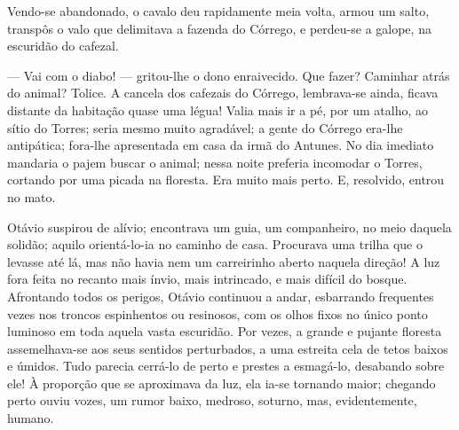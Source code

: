 {Vendo-se abandonado, o cavalo deu rapidamente meia volta, armou
um salto, transpôs o valo que delimitava a fazenda do
Córrego, e perdeu-se a galope, na escuridão do cafezal.

--- Vai com o diabo! --- gritou-lhe o dono enraivecido.
Que fazer? Caminhar atrás do animal? Tolice. A cancela dos cafezais do
Córrego, lembrava-se ainda, ficava distante da habitação
quase uma légua! Valia mais ir a pé, por um atalho, ao
sítio do Torres; seria mesmo muito agradável; a gente
do Córrego era-lhe antipática; fora-lhe apresentada em
casa da irmã do Antunes. No dia imediato mandaria o pajem
buscar o animal; nessa noite preferia incomodar o Torres, cortando por
uma picada na floresta. Era muito mais perto. E, resolvido, entrou no
mato.





Otávio suspirou de alívio; encontrava um guia, um
companheiro, no meio daquela solidão; aquilo orientá-lo-ia no caminho de
casa. Procurava uma trilha que o levasse até lá, mas não havia nem um
carreirinho aberto naquela direção! A luz fora feita no recanto
mais ínvio, mais intrincado, e mais difícil do bosque.
Afrontando todos os perigos, Otávio continuou a andar,
esbarrando frequentes vezes nos troncos espinhentos ou
resinosos, com os olhos fixos no único ponto luminoso em toda
aquela vasta escuridão. Por vezes, a grande e pujante floresta
assemelhava-se aos seus sentidos perturbados, a uma estreita
cela de tetos baixos e úmidos. Tudo parecia
cerrá-lo de perto e prestes a esmagá-lo, desabando
sobre ele! À proporção que se aproximava da luz, ela ia-se tornando
maior; chegando perto ouviu vozes, um rumor baixo, medroso, soturno,
mas, evidentemente, humano.

}
